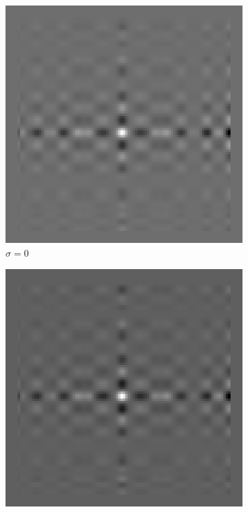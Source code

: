 \begin{figure}[htpb]
\begin{subfigure}{.25\textwidth}
\end{subfigure}
\quad
\begin{subfigure}{.25\textwidth}
\includegraphics[width=1\textwidth]{img/NGCRank1sigma0}
\caption{$\sigma = 0$}
\end{subfigure}%
\begin{subfigure}{.25\textwidth}
\includegraphics[width=1\textwidth]{img/NGCRank1sigma75}

\end{subfigure}
\end{figure}
